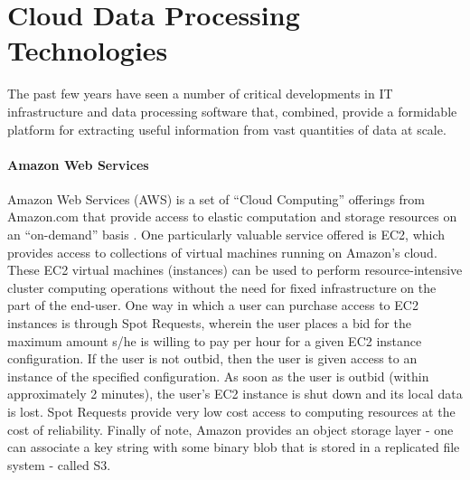 \documentclass{thesis}
\begin{document}
    \section{Cloud Data Processing Technologies}
        The past few years have seen a number of critical developments in IT
        infrastructure and data processing software that, combined, provide
        a formidable platform for extracting useful information from vast
        quantities of data at scale. 
        \paragraph{Amazon Web Services}%
            Amazon Web Services (AWS) is a set of ``Cloud Computing'' offerings
            from Amazon.com that provide access to elastic computation and storage
            resources on an ``on-demand'' basis \cite{aws}. One particularly valuable
            service offered is EC2, which provides access to collections of virtual
            machines running on Amazon's cloud. These EC2 virtual machines (instances)
            can be used to perform resource-intensive cluster computing operations without
            the need for fixed infrastructure on the part of the end-user. One way in which
            a user can purchase access to EC2 instances is through Spot Requests, wherein the
            user places a bid for the maximum amount s/he is willing to pay per hour for a given
            EC2 instance configuration. If the user is not outbid, then the user is given access
            to an instance of the specified configuration. As soon as the user is outbid (within
            approximately 2 minutes), the user's EC2 instance is shut down and its local data is
            lost. Spot Requests provide very low cost access to computing resources at the cost of
            reliability.%
            Finally of note, Amazon provides an object storage layer - one can associate a key string
            with some binary blob that is stored in a replicated file system - called S3.
\end{document}
